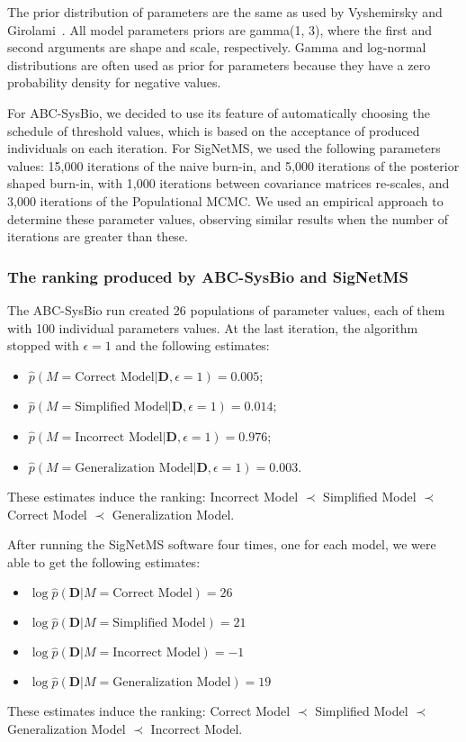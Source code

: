The prior distribution of parameters are the same as used by Vyshemirsky
and Girolami~\cite{Vyshemirsky2007}. All model parameters priors are
gamma(1, 3), where the first and second arguments are shape and scale,
respectively. Gamma and log-normal distributions are often used as prior 
for parameters because they have a zero probability density for negative
values.

For ABC-SysBio, we decided to use its feature of automatically choosing
the schedule of threshold values, which is based on the acceptance of
produced individuals on each iteration. For SigNetMS, we used the
following parameters values: 15,000 iterations of the naive burn-in, and
5,000 iterations of the posterior shaped burn-in, with 1,000 iterations
between covariance matrices re-scales, and 3,000 iterations of the
Populational MCMC. We used an empirical approach to determine these
parameter values, observing similar results when the number of
iterations are greater than these.

\subsubsection{The ranking produced by ABC-SysBio and SigNetMS}
The ABC-SysBio run created 26 populations of parameter values, each of 
them with 100 individual parameters values. At the last iteration, the 
algorithm stopped with $\epsilon = 1$ and the following estimates: 
\begin{itemize}
    \item{$\hat{p} (M = \text{Correct Model} | {\bm D}, \epsilon = 1) =
        0.005$;}
    \item{$\hat{p} (M = \text{Simplified Model} | {\bm D}, \epsilon = 1)
        = 0.014$;} 
    \item{$\hat{p} (M = \text{Incorrect Model} | {\bm D}, \epsilon = 1)
        = 0.976$;}
    \item{$\hat{p} (M = \text{Generalization Model} | {\bm D}, \epsilon
        = 1) = 0.003$.}
\end{itemize}
These estimates induce the ranking: Incorrect Model $\prec$ Simplified 
Model $\prec$ Correct Model $\prec$ Generalization Model.

After running the SigNetMS software four times, one for each model, we
were able to get the following estimates:
\begin{itemize}
    \item{$\log \hat{p}({\bm D} | M = \text{Correct Model}) = 26$}
    \item{$\log \hat{p}({\bm D} | M = \text{Simplified Model}) = 21$}
    \item{$\log \hat{p}({\bm D} | M = \text{Incorrect Model}) = -1$}
    \item{$\log \hat{p}({\bm D} | M = \text{Generalization Model}) =
        19$}
\end{itemize}
These estimates induce the ranking: Correct Model $\prec$ Simplified
Model $\prec$ Generalization Model $\prec$ Incorrect Model.

